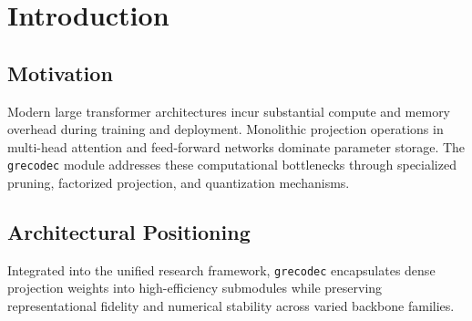 \section{Introduction}

\subsection{Motivation}
Modern large transformer architectures incur substantial compute and memory overhead during training and deployment. Monolithic projection operations in multi-head attention and feed-forward networks dominate parameter storage. The \texttt{grecodec} module addresses these computational bottlenecks through specialized pruning, factorized projection, and quantization mechanisms.

\subsection{Architectural Positioning}
Integrated into the unified research framework, \texttt{grecodec} encapsulates dense projection weights into high-efficiency submodules while preserving representational fidelity and numerical stability across varied backbone families.
